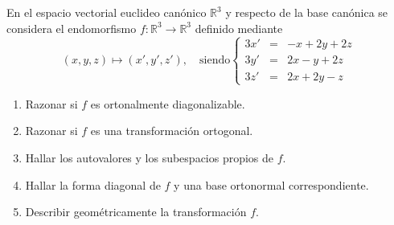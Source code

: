 \begin{enunciado}
 En el espacio vectorial euclideo can\'onico $\mathbb{R}^3$ y respecto de la base can\'onica se considera el endomorfismo $f: \mathbb{R}^3 \to \mathbb{R}^3$ definido mediante
 \begin{equation*}
  (x,y,z) \mapsto (x', y', z'), \quad \text{siendo} \left\{
  \begin{matrix}
   3x' & = & -x + 2y + 2z \\
   3y' & = & 2x -  y + 2z \\
   3z' & = & 2x + 2y -  z
  \end{matrix}
  \right.
 \end{equation*}
 \begin{enumerate}[$a$)]
  \item Razonar si $f$ es ortonalmente diagonalizable.
  \item Razonar si $f$ es una transformaci\'on ortogonal.
  \item Hallar los autovalores y los subespacios propios de $f$.
  \item Hallar la forma diagonal de $f$ y una base ortonormal correspondiente.
  \item Describir geom\'etricamente la transformaci\'on $f$.
 \end{enumerate}
\end{enunciado}
 
